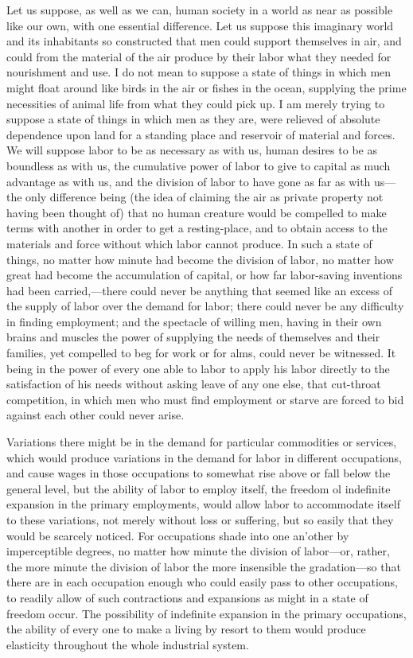 \documentclass{book}
\begin{document}
Let us suppose, as well as we can, human society in a world as near as possible like our own, with one essential difference. Let us suppose this imaginary world and its inhabitants so constructed that men could support themselves in air, and could from the material of the air produce by their labor what they needed for nourishment and use. I do not mean to suppose a state of things in which men might float around like birds in the air or fishes in the ocean, supplying the prime necessities of animal life from what they could pick up. I am merely trying to suppose a state of things in which men as they are, were relieved of absolute dependence upon land for a standing place and reservoir of material and forces. We will suppose labor to be as necessary as with us, human desires to be as boundless as with us, the cumulative power of labor to give to capital as much advantage as with us, and the division of labor to have gone as far as with us—the only difference being (the idea of claiming the air as private property not having been thought of) that no human creature would be compelled to make terms with another in order to get a resting-place, and to obtain access to the materials and force without which labor cannot produce. In such a state of things, no matter how minute had become the division of labor, no matter how great had become the accumulation of capital, or how far labor-saving inventions had been carried,—there could never be anything that seemed like an excess of the supply of labor over the demand for labor; there could never be any difficulty in finding employment; and the spectacle of willing men, having in their own brains and muscles the power of supplying the needs of themselves and their families, yet compelled to beg for work or for alms, could never be witnessed. It being in the power of every one able to labor to apply his labor directly to the satisfaction of his needs without asking leave of any one else, that cut-throat competition, in which men who must find employment or starve are forced to bid against each other could never arise.

Variations there might be in the demand for particular commodities or services, which would produce variations in the demand for labor in different occupations, and cause wages in those occupations to somewhat rise above or fall below the general level, but the ability of labor to employ itself, the freedom ol indefinite expansion in the primary employments, would allow labor to accommodate itself to these variations, not merely without loss or suffering, but so easily that they would be scarcely noticed. For occupations shade into one an’other by imperceptible degrees, no matter how minute the division of labor—or, rather, the more minute the division of labor the more insensible the gradation—so that there are in each occupation enough who could easily pass to other occupations, to readily allow of such contractions and expansions as might in a state of freedom occur. The possibility of indefinite expansion in the primary occupations, the ability of every one to make a living by resort to them would produce elasticity throughout the whole industrial system.
\end{document}
